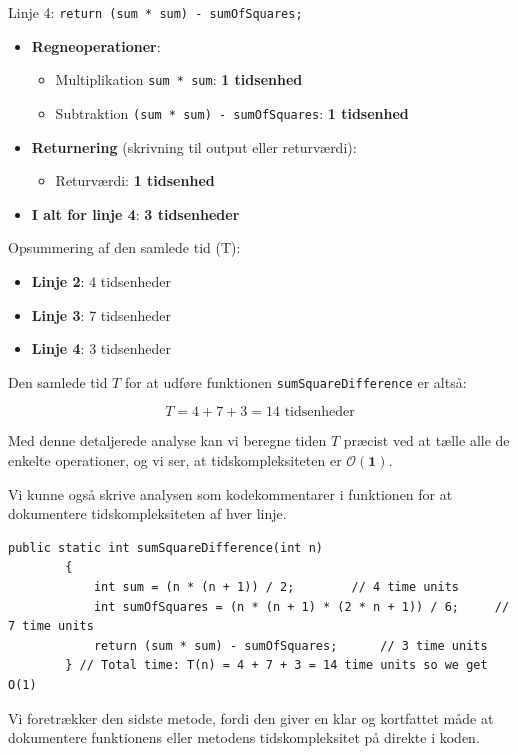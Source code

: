 \begin{example}
    Linje 4: \texttt{return (sum * sum) - sumOfSquares;}
    \begin{itemize}
        \item \textbf{Regneoperationer}:
            \begin{itemize}
                \item Multiplikation \texttt{sum * sum}: \textbf{1 tidsenhed}
                \item Subtraktion \texttt{(sum * sum) - sumOfSquares}: \textbf{1 tidsenhed}
            \end{itemize}
        \item \textbf{Returnering} (skrivning til output eller returværdi): 
            \begin{itemize}
                \item Returværdi: \textbf{1 tidsenhed}
            \end{itemize}
        \item \textbf{I alt for linje 4}: \textbf{3 tidsenheder}
    \end{itemize}

    Opsummering af den samlede tid (T):
    \begin{itemize}
        \item \textbf{Linje 2}: 4 tidsenheder
        \item \textbf{Linje 3}: 7 tidsenheder
        \item \textbf{Linje 4}: 3 tidsenheder
    \end{itemize}

    Den samlede tid $T$ for at udføre funktionen \texttt{sumSquareDifference} er altså:

    \[
    T = 4 + 7 + 3 = 14 \text{ tidsenheder}
    \]

    Med denne detaljerede analyse kan vi beregne tiden $T$ præcist ved at tælle alle de enkelte operationer, og vi ser, at tidskompleksiteten er $\boldsymbol{\mathcal{O}(1)}$.

    Vi kunne også skrive analysen som kodekommentarer i funktionen for at dokumentere tidskompleksiteten af hver linje.

    \begin{lstlisting}[style=javaStyle, caption={Simpel funktion}, label={lst:java_simple_function2}]
        public static int sumSquareDifference(int n)
        {
            int sum = (n * (n + 1)) / 2;        // 4 time units
            int sumOfSquares = (n * (n + 1) * (2 * n + 1)) / 6;     // 7 time units
            return (sum * sum) - sumOfSquares;      // 3 time units
        } // Total time: T(n) = 4 + 7 + 3 = 14 time units so we get O(1)
    \end{lstlisting}
    
Vi foretrækker den sidste metode, fordi den giver en klar og kortfattet måde at dokumentere funktionens eller metodens tidskompleksitet på direkte i koden.
        
\end{example}


